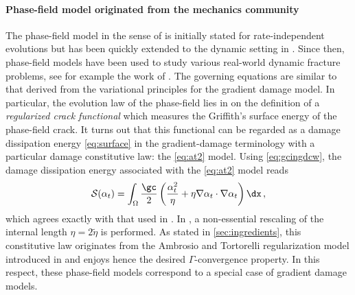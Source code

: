 \paragraph{Phase-field model originated from the mechanics community}
The phase-field model in the sense of \cite{MieheHofackerWelschinger:2010,MieheWelschingerHofacker:2010} is initially stated for rate-independent evolutions but has been quickly extended to the dynamic setting in \cite{HofackerMiehe:2012,HofackerMiehe:2013}. Since then, phase-field models have been used to study various real-world dynamic fracture problems, see for example the work of \cite{BordenVerhooselScottHughesLandis:2012,SchlueterWillenbuecherKuhnMueller:2014}. The governing equations are similar to that derived from the variational principles for the gradient damage model. In particular, the evolution law of the phase-field  lies in on the definition of a \emph{regularized crack functional} which measures the Griffith's surface energy of the phase-field crack. It turns out that this functional can be regarded as a damage dissipation energy \eqref{eq:surface} in the gradient-damage terminology with a particular damage constitutive law: the \eqref{eq:at2} model. Using \eqref{eq:gcingdcw}, the damage dissipation energy associated with the \eqref{eq:at2} model reads
\[
\mathcal{S}(\alpha_t)=\int_\Omega\frac{\gc}{2}\left(\frac{\alpha_t^2}{\eta}+\eta\nabla\alpha_t\cdot\nabla\alpha_t\right)\dx\,,
\]
which agrees exactly with that used in \cite{MieheHofackerWelschinger:2010,MieheWelschingerHofacker:2010,HofackerMiehe:2012,HofackerMiehe:2013,KlinsmannRosatoKamlahMcMeeking:2015}. In \cite{BordenVerhooselScottHughesLandis:2012,SchlueterWillenbuecherKuhnMueller:2014,MayVignolletBorst:2015}, a non-essential rescaling of the internal length $\eta=2\widetilde{\eta}$ is performed. As stated in \cref{sec:ingredients}, this constitutive law originates from the Ambrosio and Tortorelli regularization model introduced in \cite{BourdinFrancfortMarigo:2000} and enjoys hence the desired $\Gamma$-convergence property. In this respect, these phase-field models correspond to a special case of gradient damage models.

